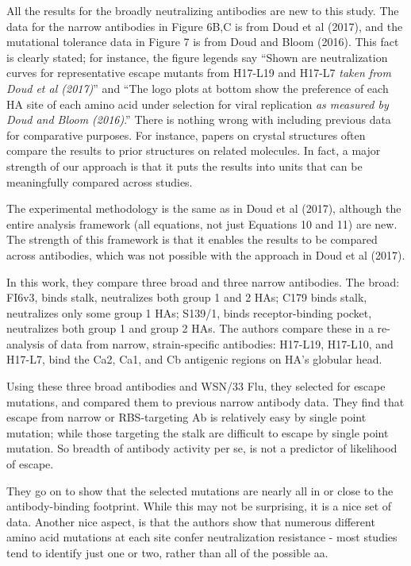 \documentclass[11pt, oneside]{article}   	%
\begin{document}
{\color{black}
All the results for the broadly neutralizing antibodies are new to this study.
The data for the narrow antibodies in Figure 6B,C is from Doud et al (2017), and the mutational tolerance data in Figure 7 is from Doud and Bloom (2016).
This fact is clearly stated; for instance, the figure legends say ``Shown are neutralization curves for representative escape mutants from H17-L19 and H17-L7 \emph{taken from Doud et al (2017)}'' and ``The logo plots at bottom show the preference of each HA site of each amino acid under selection for viral replication \emph{as measured by Doud and Bloom (2016)}.''
There is nothing wrong with including previous data for comparative purposes.
For instance, papers on crystal structures often compare the results to prior structures on related molecules.
In fact, a major strength of our approach is that it puts the results into units that can be meaningfully compared across studies.

The experimental methodology is the same as in Doud et al (2017), although the entire analysis framework (all equations, not just Equations 10 and 11) are new.
The strength of this framework is that it enables the results to be compared across antibodies, which was not possible with the approach in Doud et al (2017). 
}

In this work, they compare three broad and three narrow antibodies. The broad: FI6v3, binds stalk, neutralizes both group 1 and 2 HAs; C179 binds stalk, neutralizes only some group 1 HAs; S139/1, binds receptor-binding pocket, neutralizes both group 1 and group 2 HAs. The authors compare these in a re-analysis of data from narrow, strain-specific antibodies: H17-L19, H17-L10, and H17-L7, bind the Ca2, Ca1, and Cb antigenic regions on HA's globular head.

Using these three broad antibodies and WSN/33 Flu, they selected for escape mutations, and compared them to previous narrow antibody data. They find that escape from narrow or RBS-targeting Ab is relatively easy by single point mutation; while those targeting the stalk are difficult to escape by single point mutation. So breadth of antibody activity per se, is not a predictor of likelihood of escape.

They go on to show that the selected mutations are nearly all in or close to the antibody-binding footprint. While this may not be surprising, it is a nice set of data. Another nice aspect, is that the authors show that numerous different amino acid mutations at each site confer neutralization resistance - most studies tend to identify just one or two, rather than all of the possible aa.
\end{document}
